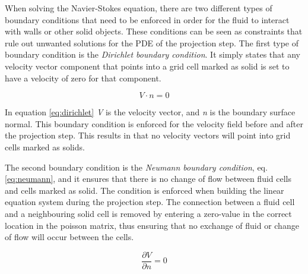 When solving the Navier-Stokes equation, there are two different types of boundary conditions that need to be enforced in order for the fluid to interact with walls or other solid objects. These conditions can be seen as constraints that rule out unwanted solutions for the PDE of the projection step. The first type of boundary condition is the \emph{Dirichlet boundary condition}. It simply states that any velocity vector component that points into a grid cell marked as solid is set to have a velocity of zero for that component.

\begin{equation}
\label{eq:dirichlet}
V \cdot n = 0
\end{equation}

In equation \ref{eq:dirichlet} \emph{V} is the velocity vector, and \emph{n} is the boundary surface normal. This boundary condition is enforced for the velocity field before and after the projection step. This results in that no velocity vectors will point into grid cells marked as solids.

The second boundary condition is the \emph{Neumann boundary condition}, eq. \ref{eq:neumann}, and it ensures that there is no change of flow between fluid cells and cells marked as solid. The condition is enforced when building the linear equation system during the projection step. The connection between a fluid cell and a neighbouring solid cell is removed by entering a zero-value in the correct location in the poisson matrix, thus ensuring that no exchange of fluid or change of flow will occur between the cells.

\begin{equation}
\label{eq:neumann}
\frac{\partial V}{\partial n} = 0
\end{equation}